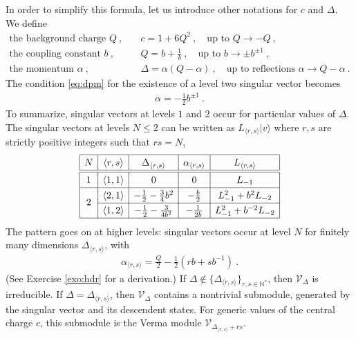 \documentclass[12pt, a4paper]{article}
\theoremstyle{break}
\begin{document}
In order to simplify this formula, let us introduce other notations for $c$ and $\Delta$. We define
\begin{align}
 \text{the background charge } Q \ , & \quad c = 1+6Q^2\ , \quad \text{up to } Q \to -Q\ ,
 \\
 \text{the coupling constant } b \ , & \quad Q = b+\frac{1}{b} \ , \quad \text{up to } b\to \pm b^{\pm 1}\ ,
 \\
 \text{the momentum } \alpha\  , &\quad \Delta = \alpha(Q-\alpha)\ , \quad \text{up to reflections } \alpha \to Q-\alpha\ .
\end{align}
The condition \eqref{eq:dpm} for the existence of a level two singular vector becomes 
\begin{align}
 \alpha = -\frac12 b^{\pm 1}\ .
\end{align}
To summarize, singular vectors at levels $1$ and $2$ occur for particular values of $\Delta$. The singular vectors at levels $N\leq 2$ can be written as $L_{\langle r,s\rangle}|v\rangle$ where $r,s$ are strictly positive integers such that $rs=N$,
\begin{align}
\renewcommand{\arraystretch}{1.3}
\begin{array}{|c|c|c|c|c|}
\hline 
N & \langle r,s\rangle & \Delta_{\langle r,s\rangle} & \alpha_{\langle r,s\rangle} & L_{\langle r,s\rangle} 
\\
\hline\hline
1 & \langle 1,1\rangle & 0 & 0 & L_{-1}
\\
\hline
\multirow{2}{*}{2} & 
\langle 2,1\rangle & -\frac12 -\frac{3}{4} b^2 & -\frac{b}{2} & L_{-1}^2 + b^2 L_{-2}
\\
\cline{2-5}
& \langle 1,2\rangle & -\frac12 - \frac{3}{4b^2} &  -\frac{1}{2b} & L_{-1}^2 + b^{-2} L_{-2} 
\\
\hline
\end{array}
\label{lot}
\end{align}
The pattern goes on at higher levels: singular vectors occur at level $N$ for finitely many dimensions $\Delta_{\langle r,s\rangle}$, with
\begin{align}
  \alpha_{\langle r,s\rangle} = \frac{Q}{2} - \frac12(rb+sb^{-1})\ .
  \label{eq:ars}
 \end{align}
 (See Exercise \ref{exo:hdr} for a derivation.)
If $\Delta\notin\{\Delta_{\langle r,s\rangle}\}_{r,s\in\mathbb{N}^*}$, then $\mathcal V_\Delta$ is irreducible. If $\Delta = \Delta_{\langle r,s\rangle}$, then $\mathcal V_\Delta$ contains a nontrivial submodule, generated by the singular vector and its descendent states. For generic values of the central charge $c$, this submodule is the Verma module $\mathcal V_{\Delta_{\langle r,s\rangle}+rs}$.
\end{document}
